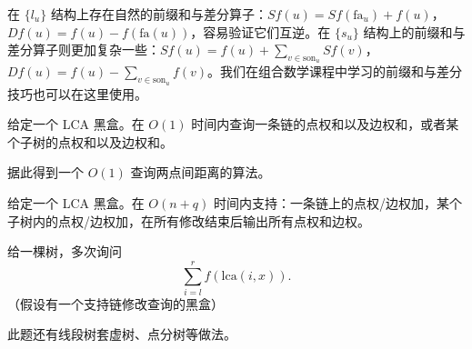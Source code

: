 在 $\{l_u\}$ 结构上存在自然的前缀和与差分算子：$Sf(u)=Sf(\mathrm{fa}_u)+f(u)$，$Df(u)=f(u)-f(\mathrm{fa}(u))$，容易验证它们互逆。在 $\{s_u\}$ 结构上的前缀和与差分算子则更加复杂一些：$Sf(u)=f(u)+\sum_{v\in \mathrm{son}_u} Sf(v)$，$Df(u)=f(u)-\sum_{v\in \mathrm{son}_u} f(v)$。我们在组合数学课程中学习的前缀和与差分技巧也可以在这里使用。

\begin{exercise}[应用一]
    给定一个 LCA 黑盒。在 $O(1)$ 时间内查询一条链的点权和以及边权和，或者某个子树的点权和以及边权和。
\end{exercise}
\begin{exercise}
    据此得到一个 $O(1)$ 查询两点间距离的算法。
\end{exercise}

\begin{example}[应用二]
    给定一个 LCA 黑盒。在 $O(n+q)$ 时间内支持：一条链上的点权/边权加，某个子树内的点权/边权加，在所有修改结束后输出所有点权和边权。
\end{example}

\begin{example}[P4211]
    给一棵树，多次询问
    $$
    \sum_{i=l}^r f(\mathrm{lca}(i,x)).
    $$
    （假设有一个支持链修改查询的黑盒）
\end{example}
\begin{remark}
    此题还有线段树套虚树、点分树等做法。
\end{remark}




